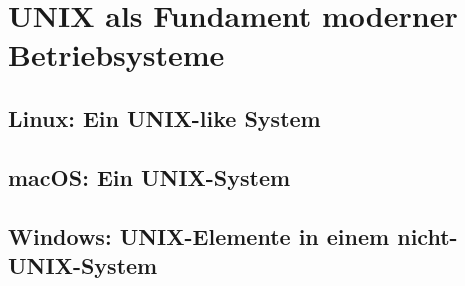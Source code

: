 \section{UNIX als Fundament moderner Betriebsysteme}
\subsection{Linux: Ein UNIX-like System}
\subsection{macOS: Ein UNIX-System}
\subsection{Windows: UNIX-Elemente in einem nicht-UNIX-System}